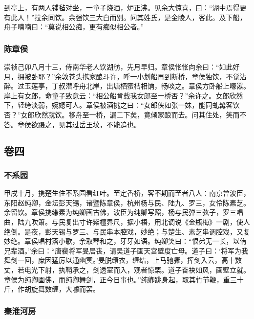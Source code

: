 \documentclass[]{article}
\begin{document}
到亭上，有两人铺毡对坐，一童子烧酒，炉正沸。见余大惊喜，曰：``湖中焉得更有此人！''拉余同饮。余强饮三大白而别。问其姓氏，是金陵人，客此。及下船，舟子喃喃曰：``莫说相公痴，更有痴似相公者。''

\hypertarget{header-n271}{%
\subsubsection{陈章侯}\label{header-n271}}

崇祯己卯八月十三，侍南华老人饮湖舫，先月早归。章侯怅怅向余曰：``如此好月，拥被卧耶？''余敦苍头携家酿斗许，呼一小划船再到断桥，章侯独饮，不觉沾醉。过玉莲亭，丁叔潜呼舟北岸，出塘栖蜜桔相饷，畅啖之。章侯方卧船上嚎嚣。岸上有女郎，命童子致意云：``相公船肯载我女郎至一桥否？''余许之。女郎欣然下，轻绔淡弱，婉嫕可人。章侯被酒挑之曰：``女郎侠如张一妹，能同虬髯客饮否？''女郎欣然就饮。移舟至一桥，漏二下矣，竟倾家酿而去。问其住处，笑而不答。章侯欲蹑之，见其过岳王坟，不能追也。

\hypertarget{header-n275}{%
\subsection{卷四}\label{header-n275}}

\hypertarget{header-n277}{%
\subsubsection{不系园}\label{header-n277}}

甲戌十月，携楚生住不系园看红叶。至定香桥，客不期而至者八人：南京曾波臣，东阳赵纯卿，金坛彭天锡，诸暨陈章侯，杭州杨与民、陆九、罗三，女伶陈素芝。余留饮。章侯携缣素为纯卿画古佛，波臣为纯卿写照，杨与民弹三弦子，罗三唱曲，陆九吹箫。与民复出寸许紫檀界尺，据小梧，用北调说《金瓶梅》一剧，使人绝倒。是夜，彭天锡与罗三、与民串本腔戏，妙绝；与楚生、素芝串调腔戏，又复妙绝。章侯唱村落小歌，余取琴和之，牙牙如语。纯卿笑曰：``恨弟无一长，以侑兄辈酒。''余曰：``唐裴将军旻居丧，请吴道子画天宫壁度亡母。道子曰：`将军为我舞剑一回，庶因猛厉以通幽冥。'旻脱缞衣，缠结，上马驰骤，挥剑入云，高十数丈，若电光下射，执鞘承之，剑透室而入，观者惊栗。道子奋袂如风，画壁立就。章侯为纯卿画佛，而纯卿舞剑，正今日事也。''纯卿跳身起，取其竹节鞭，重三十斤，作胡旋舞数缠，大噱而罢。

\hypertarget{header-n282}{%
\subsubsection{秦淮河房}\label{header-n282}}
\end{document}
